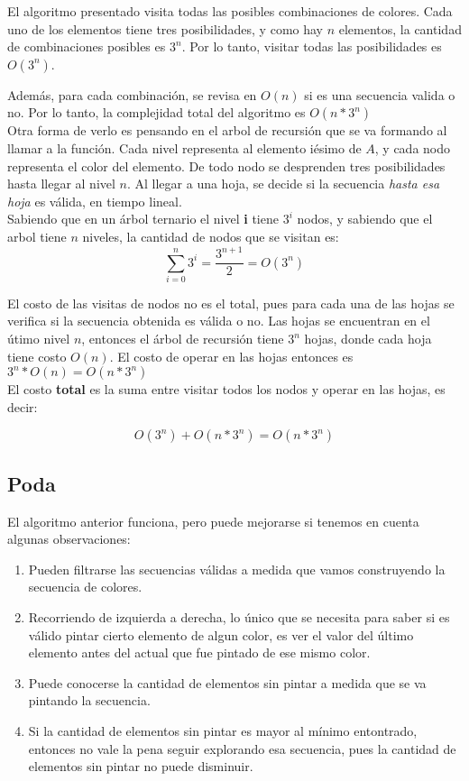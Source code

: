 El algoritmo presentado visita todas las posibles combinaciones de colores. Cada uno de los elementos tiene tres posibilidades, y como hay $n$ elementos, la cantidad de combinaciones posibles es $3^{n}$. Por lo tanto, visitar todas las posibilidades es $O(3^{n})$.

Además, para cada combinación, se revisa en $O(n)$ si es una secuencia valida o no. Por lo tanto, la complejidad total del algoritmo es $O(n * 3^{n})$ \\

Otra forma de verlo es pensando en el arbol de recursión que se va formando al llamar a la función. Cada nivel representa al elemento iésimo de $A$, y cada nodo representa el color del elemento. De todo nodo se desprenden tres posibilidades hasta llegar al nivel $n$. Al llegar a una hoja, se decide si la secuencia \textit{hasta esa hoja} es válida, en tiempo lineal. \\

Sabiendo que en un árbol ternario el nivel \textbf{i} tiene $3^{i}$ nodos, y sabiendo que el arbol tiene $n$ niveles, la cantidad de nodos que se visitan es: \\

$$\sum_{i = 0}^{n} 3^{i} = \frac{3^{n+1}}{2} = O(3^n)$$

El costo de las visitas de nodos no es el total, pues para cada una de las hojas se verifica si la secuencia obtenida es válida o no. Las hojas se encuentran en el útimo nivel $n$, entonces el árbol de recursión tiene $3^n$ hojas, donde cada hoja tiene costo $O(n)$. El costo de operar en las hojas entonces es $3^n * O(n) = O(n * 3^n)$ \\

El costo \textbf{total} es la suma entre visitar todos los nodos y operar en las hojas, es decir:

$$O(3^n) + O(n * 3^n) = O(n * 3^n) $$


\subsection{Poda}

El algoritmo anterior funciona, pero puede mejorarse si tenemos en cuenta algunas observaciones:

\begin{enumerate}
\item Pueden filtrarse las secuencias válidas a medida que vamos construyendo la secuencia de colores.
\item Recorriendo de izquierda a derecha, lo único que se necesita para saber si es válido pintar cierto elemento de algun color, es ver el valor del último elemento antes del actual que fue pintado de ese mismo color.
\item Puede conocerse la cantidad de elementos sin pintar a medida que se va pintando la secuencia.
\item Si la cantidad de elementos sin pintar es mayor al mínimo entontrado, entonces no vale la pena seguir explorando esa secuencia, pues la cantidad de elementos sin pintar no puede disminuir.
\end{enumerate}
